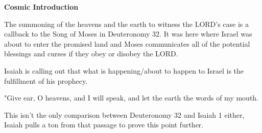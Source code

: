 \documentclass[11pt]{article}
\begin{document}
{\large\bfseries Cosmic Introduction}
{\vspace{1em}}

The summoning of the heavens and the earth to witness the LORD's case is a callback to the Song of Moses in Deuteronomy 32.
It was here where Israel was about to enter the promised land and Moses communicates all of the potential blessings and curses
if they obey or disobey the LORD.

Isaiah is calling out that what is happening/about to happen to Israel is the fulfillment of his prophecy.
{\vspace{1em}}


    \begin{versesection}{2em}

 "\textcolor{highlightgreen}{Give ear}, O heavens, and I will speak,
\poetryline and let the earth  the words of my mouth.
\end{versesection}
{\vspace{1em}}
This isn't the only comparison between Deuteronomy 32 and Isaiah 1 either, Isaiah pulls a ton from that passage to prove this point further.
\end{document}

